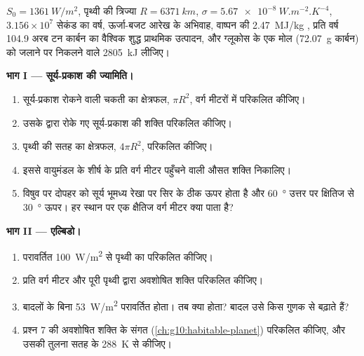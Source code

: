 \begin{problem}
\label{pb:g10:earth-energy-budget:1}
$S_0 = \qty{1361}{W/m^2}$, पृथ्वी की त्रिज्या $R = \qty{6371}{km}$,
$\sigma = \qty{5.67e-8}{W.m^{-2}.K^{-4}}$, $3.156\times10^7$
सेकंड का वर्ष, ऊर्जा-बजट आरेख के अभिवाह, वाष्पन की
\qty{2.47}{MJ/kg} , प्रति वर्ष \num{104.9} अरब टन कार्बन का वैश्विक
शुद्ध प्राथमिक उत्पादन, और ग्लूकोस के एक मोल (\qty{72.07}{g} कार्बन) को जलाने पर
निकलने वाले \qty{2805}{kJ} लीजिए।

\medskip
\noindent\textbf{भाग I --- सूर्य-प्रकाश की ज्यामिति।}
\begin{enumerate}
  \item सूर्य-प्रकाश रोकने वाली चकती का क्षेत्रफल, $\pi R^2$,
        वर्ग मीटरों में परिकलित कीजिए।
  \item उसके द्वारा रोके गए सूर्य-प्रकाश की शक्ति परिकलित कीजिए।
  \item पृथ्वी की सतह का क्षेत्रफल, $4\pi R^2$, परिकलित कीजिए।
  \item इससे वायुमंडल के शीर्ष के प्रति वर्ग मीटर पहुँचने वाली औसत शक्ति
        निकालिए।
  \item विषुव पर दोपहर को सूर्य भूमध्य रेखा पर सिर के ठीक ऊपर होता है और
        \qty{60}{\degree} उत्तर पर क्षितिज से \qty{30}{\degree} ऊपर। हर स्थान पर
        एक क्षैतिज वर्ग मीटर क्या पाता है?
\end{enumerate}

\medskip
\noindent\textbf{भाग II --- एल्बिडो।}
\begin{enumerate}[resume]
  \item परावर्तित \qty{100}{W/m^2} से पृथ्वी का  परिकलित कीजिए।
  \item प्रति वर्ग मीटर और पूरी पृथ्वी द्वारा अवशोषित शक्ति परिकलित कीजिए।
  \item बादलों के बिना \qty{53}{W/m^2} परावर्तित होता। तब  क्या होता? बादल
        उसे किस गुणक से बढ़ाते हैं?
  \item प्रश्न 7 की अवशोषित शक्ति के संगत 
        (\cref{ch:g10:habitable-planet}) परिकलित कीजिए, और उसकी तुलना
        सतह के \qty{288}{K} से कीजिए।
\end{enumerate}


\end{problem}
